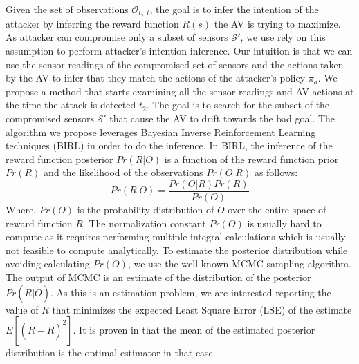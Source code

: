 \documentclass[conference]{IEEEtran}
\begin{document}
Given the set of observations $\mathcal{O}_{t_2:t}$, the goal is to infer the intention of the attacker by inferring the reward function $R(s)$ the AV is trying to maximize. As attacker can compromise only a subset of sensors $\mathcal{S}'$, we use rely on this assumption to perform attacker's intention inference. Our intuition is that we can use the sensor readings of the compromised set of sensors and the actions taken by the AV to infer that they match the actions of the attacker's policy $\pi_a$. We propose a method that starts examining all the sensor readings and AV actions at the time the attack is detected $t_2$. The goal is to search for the subset of the compromised sensors $\mathcal{S}'$  that cause the AV to drift towards the bad goal. The algorithm we propose leverages Bayesian Inverse Reinforcement Learning techniques (BIRL)\cite{Ramachandran2007} in order to do the inference. In BIRL, the inference of the reward function posterior $Pr(R|O)$ is a function of the reward function prior $Pr(R)$ and the likelihood of the observations $Pr(O|R)$ as follows:
\begin{equation} 
    Pr(R|O) = \frac{Pr(O|R)Pr(R)}{Pr(O)}
\end{equation}
Where, $Pr(O)$ is the probability distribution of $O$ over the entire space of reward function $R$. The normalization constant $Pr(O)$ is usually hard to compute as it requires performing multiple integral calculations which is usually not feasible to compute analytically. To estimate the posterior distribution while avoiding calculating $Pr(O)$, we use the well-known MCMC sampling algorithm. The output of MCMC is an estimate of the distribution of the posterior $Pr(\tilde{R}|O)$. As this is an estimation problem, we are interested reporting the value of $R$ that minimizes the expected Least Square Error (LSE) of the estimate $E[(R-\tilde{R})^2]$. It is proven in \cite{Ramachandran2007} that the mean of the estimated posterior distribution is the optimal estimator in that case.
\end{document}

